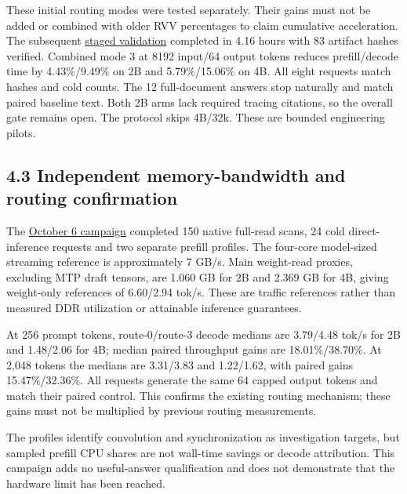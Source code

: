 \documentclass[10pt,a4paper]{article}
\begin{document}
These initial routing modes were tested separately. Their gains must not
be added or combined with older RVV percentages to claim cumulative
acceleration. The subsequent
\href{https://github.com/MoyaMryia/riscv-accl/blob/main/spacemit/reports/2026-10-03-staged-validation-results.md}{staged
validation} completed in 4.16 hours with 83 artifact hashes verified.
Combined mode 3 at 8192 input/64 output tokens reduces prefill/decode
time by 4.43\%/9.49\% on 2B and 5.79\%/15.06\% on 4B. All eight requests
match hashes and cold counts. The 12 full-document answers stop
naturally and match paired baseline text. Both 2B arms lack required
tracing citations, so the overall gate remains open. The protocol skips
4B/32k. These are bounded engineering pilots.

\hypertarget{independent-memory-bandwidth-and-routing-confirmation}{%
\subsection{4.3 Independent memory-bandwidth and routing
confirmation}\label{independent-memory-bandwidth-and-routing-confirmation}}

The
\href{https://github.com/MoyaMryia/riscv-accl/blob/main/spacemit/reports/2026-10-06-k1-roofline-results.md}{October
6 campaign} completed 150 native full-read scans, 24 cold
direct-inference requests and two separate prefill profiles. The
four-core model-sized streaming reference is approximately 7 GB/s. Main
weight-read proxies, excluding MTP draft tensors, are 1.060 GB for 2B
and 2.369 GB for 4B, giving weight-only references of 6.60/2.94 tok/s.
These are traffic references rather than measured DDR utilization or
attainable inference guarantees.

At 256 prompt tokens, route-0/route-3 decode medians are 3.79/4.48 tok/s
for 2B and 1.48/2.06 for 4B; median paired throughput gains are
18.01\%/38.70\%. At 2,048 tokens the medians are 3.31/3.83 and
1.22/1.62, with paired gains 15.47\%/32.36\%. All requests generate the
same 64 capped output tokens and match their paired control. This
confirms the existing routing mechanism; these gains must not be
multiplied by previous routing measurements.

The profiles identify convolution and synchronization as investigation
targets, but sampled prefill CPU shares are not wall-time savings or
decode attribution. This campaign adds no useful-answer qualification
and does not demonstrate that the hardware limit has been reached.
\end{document}
